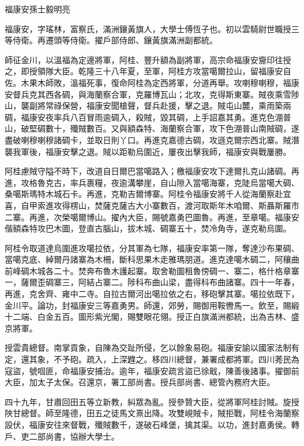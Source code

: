 
\begin{pinyinscope}
福康安孫士毅明亮

福康安，字瑤林，富察氏，滿洲鑲黃旗人，大學士傅恆子也。初以雲騎尉世職授三等侍衛。再遷頭等侍衛。擢戶部侍郎、鑲黃旗滿洲副都統。

師征金川，以溫福為定邊將軍，阿桂、豐升額為副將軍，高宗命福康安齎印往授之，即授領隊大臣。乾隆三十八年夏，至軍，阿桂方攻當噶爾拉山，留福康安自佐。木果木師敗，溫福死事，復命阿桂為定西將軍，分道再舉。攻喇穆喇穆，福康安督兵克其西各碉，與海蘭察合軍，克羅博瓦山；北攻，克得斯東寨。賊夜乘雪陟山，襲副將常祿保營，福康安聞槍聲，督兵赴援，擊之退。賊屯山麓，乘雨築兩碉，福康安夜率兵八百冒雨逾碉入，殺賊，毀其碉，上手詔嘉其勇。進克色淜普山，破堅碉數十，殲賊數百。又與額森特、海蘭察合軍，攻下色淜普山南賊碉，遂盡破喇穆喇穆諸碉卡，並取日則丫口。再進克嘉德古碉，攻遜克爾宗西北寨。賊潛襲我軍後，福康安擊之退。賊以距勒烏圍近，屢夜出擊我師，福康安與戰屢勝。

阿桂慮賊守隘不時下，改道自日爾巴當噶路入；檄福康安攻下達爾扎克山諸碉。再進，攻格魯克古，率兵裹糧，夜逾溝攀崖，自山隙入當噶海寨，克陡烏當噶大碉、桑噶斯瑪特木城石卡。再進，克勒吉爾博寨。阿桂令福康安將千人從海蘭察赴宜喜，自甲索進攻得楞山，焚薩克薩古大小寨數百，渡河取斯年木咱爾、斯聶斯羅市二寨。再進，次榮噶爾博山。擢內大臣，賜號嘉勇巴圖魯。再進，至章噶。福康安偕額森特攻巴木圖，登直古腦山，拔木城、碉寨五十，焚冷角寺，遂克勒烏圍。

阿桂令取道達烏圍進攻噶拉依，分其軍為七隊，福康安率第一隊，奪達沙布果碉、當噶克底、綽爾丹諸寨為木柵，斷科思果木走雅瑪朋道。進克達噶木碉二，阿穰曲前峰碉木城各二十。焚奔布魯木護起寨。取舍勒圖租魯傍碉一、寨二，格什格章寨一，薩爾歪碉寨三，阿結占寨二。陟科布曲山梁，盡得科布曲諸寨。四十一年春，再進，克舍齊、雍中二寺。自拉古爾河出噶拉依之右，移砲擊其寨。噶拉依既下，金川平。論功，封福康安三等嘉勇男。師還，郊勞，賜御用鞍轡馬一。飲至，賜緞十二端、白金五百。圖形紫光閣，賜雙眼花翎。授正白旗滿洲都統，出為吉林、盛京將軍。

授雲貴總督。南掌貢象，自陳為交趾所侵，乞以餘象易砲。福康安諭以國家法制有定，還其象，不予砲。疏入，上深韙之。移四川總督，兼署成都將軍。四川莠民為寇盜，號啯匪，命福康安捕治。逾年，福康安疏言盜已徐戢，陳善後諸事。擢御前大臣，加太子太保。召還京，署工部尚書。授兵部尚書、總管內務府大臣。

四十九年，甘肅回田五等立新教，糾眾為亂。授參贊大臣，從將軍阿桂討賊。旋授陜甘總督。師至隆德，田五之徒馬文熹出降。攻雙峴賊卡，賊拒戰，阿桂令海蘭察設伏，福康安往來督戰，殲賊數千，遂破石峰堡，擒其渠。以功，進封嘉勇侯。轉戶、吏二部尚書，協辦大學士。


\end{pinyinscope}

